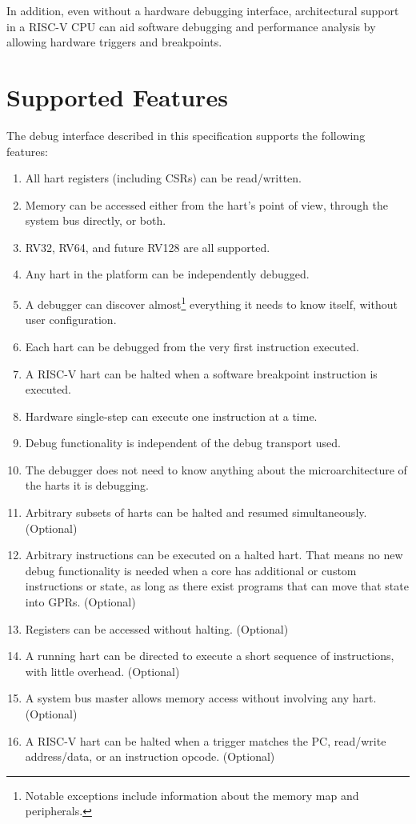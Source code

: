 In addition, even without a hardware debugging interface,
architectural support in a RISC-V CPU can aid software debugging and
performance analysis by allowing hardware triggers and breakpoints.

\section{Supported Features}

The debug interface described in this specification supports the following features:

\begin{enumerate}
   \item All hart registers (including CSRs) can be read/written.
   \item Memory can be accessed either from the hart's point of view, through
       the system bus directly, or both.
   \item RV32, RV64, and future RV128 are all supported.
   \item Any hart in the platform can be independently debugged.
   \item A debugger can discover almost\footnote{Notable exceptions include
       information about the memory map and peripherals.} everything it needs
       to know itself, without user configuration.
   \item Each hart can be debugged from the very first instruction executed.
   \item A RISC-V hart can be halted when a software breakpoint instruction is
       executed.
   \item Hardware single-step can execute one instruction at a time.
   \item Debug functionality is independent of the debug transport used.
   \item The debugger does not need to know anything about the microarchitecture
       of the harts it is debugging.

   \item Arbitrary subsets of harts can be halted and resumed simultaneously.
       (Optional)
   \item Arbitrary instructions can be executed on
       a halted hart. That means no new debug functionality is needed when a
       core has additional or custom instructions or state, as
       long as there exist programs
       that can move that state into GPRs. (Optional)
   \item Registers can be accessed without halting. (Optional)
   \item A running hart can be directed to execute a short sequence
       of instructions, with little overhead. (Optional)
   \item A system bus master allows memory access without
       involving any hart. (Optional)
   \item A RISC-V hart can be halted when a trigger matches the PC,
       read/write address/data, or an instruction opcode. (Optional)
\end{enumerate}

